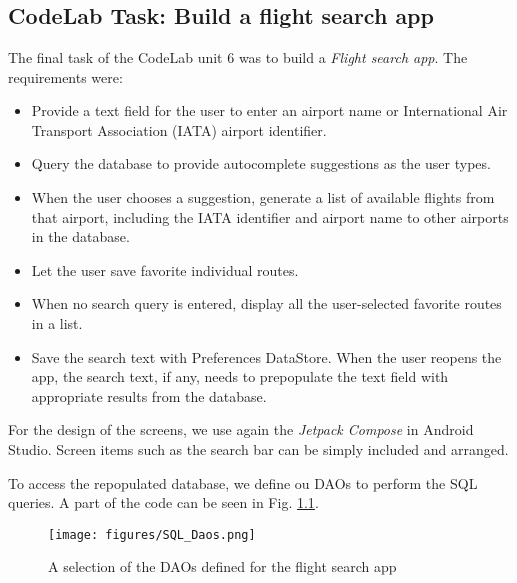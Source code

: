 \chapter{}

\section{CodeLab Task: Build a flight search app}
The final task of the CodeLab unit 6 was to build a \textsl{Flight search app}. The requirements were:
\begin{itemize}
	\item Provide a text field for the user to enter an airport name or International Air Transport Association (IATA) airport identifier.
	\item Query the database to provide autocomplete suggestions as the user types.
	\item When the user chooses a suggestion, generate a list of available flights from that airport, including the IATA identifier and airport name to other airports in the database.
	\item Let the user save favorite individual routes.
	\item When no search query is entered, display all the user-selected favorite routes in a list.
	\item Save the search text with Preferences DataStore. When the user reopens the app, the search text, if any, needs to prepopulate the text field with appropriate results from the database.
\end{itemize}

For the design of the screens, we use again the \textsl{Jetpack Compose} in Android Studio. Screen items such as the search bar can be simply included and arranged.

To access the repopulated database, we define ou DAOs to perform the SQL queries. A part of the code can be seen in Fig. \ref{fig:SQL_DAO}.
\begin{figure}
	\texttt{[image: figures/SQL\_Daos.png]}
	\caption{A selection of the DAOs defined for the flight search app}
	\label{fig:SQL_DAO}
\end{figure}

